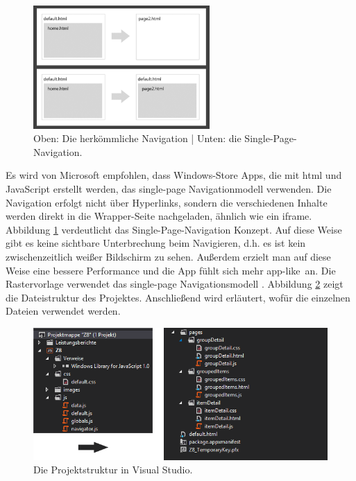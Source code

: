\documentclass[12pt,a4paper,bibtotoc,abstracton]{scrartcl}
\begin{document}
\begin{figure}[h]
	\centering
	\includegraphics[width=0.6\textwidth]{Bilder/Abbildungen/single_page.png} 
	\caption[Die Single-Page-Navigation]{Oben: Die herkömmliche Navigation | Unten: die Single-Page-Navigation. \citep{MicrosoftSinglePage2013}}
	\label{fig:single-page}
\end{figure}

Es wird von Microsoft empfohlen, dass Windows-Store Apps, die mit \ac{html} und JavaScript erstellt werden, das single-page Navigationmodell verwenden. Die Navigation erfolgt nicht über Hyperlinks, sondern die verschiedenen Inhalte werden direkt in die Wrapper-Seite nachgeladen, ähnlich wie ein iframe. Abbildung \ref{fig:single-page} verdeutlicht das Single-Page-Navigation Konzept. Auf diese Weise gibt es keine sichtbare Unterbrechung beim Navigieren, d.h. es ist kein zwischenzeitlich weißer Bildschirm zu sehen. Außerdem erzielt man auf diese Weise eine bessere Performance und die App fühlt sich mehr \glqq app-like\grqq\ an. Die Rastervorlage verwendet das single-page Navigationsmodell \citep{MicrosoftSinglePage2013}. Abbildung \ref{fig:projektmappe} zeigt die Dateistruktur des Projektes. Anschließend wird erläutert, wofür die einzelnen Dateien verwendet werden.


\begin{figure}[h]
	\centering
	\includegraphics[width=\textwidth]{Bilder/Screenshots/app/projektmappe.png} 
	\caption{Die Projektstruktur in Visual Studio.}
	\label{fig:projektmappe}
\end{figure}
\end{document}
